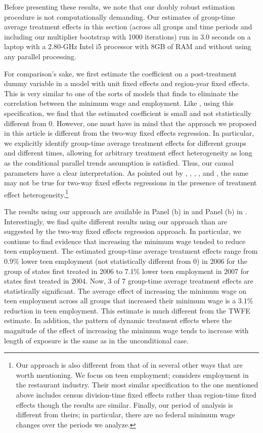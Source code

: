 \documentclass[11pt]{article}%
\theoremstyle{plain}
\numberwithin{sassumption}{section}
\numberwithin{equation}{section}
\begin{document}
Before presenting these results, we note that our doubly robust estimation
procedure is not computationally demanding. Our estimates of group-time
average treatment effects in this section (across all groups and time periods
and including our multiplier bootstrap with 1000 iterations) run in 3.0 
seconds on a laptop with a 2.80-GHz Intel i5 processor with 8GB of RAM and
without using any parallel processing.

For comparison's sake, we first estimate the coefficient on a post-treatment
dummy variable in a model with unit fixed effects and region-year fixed
effects. This is very similar to one of the sorts of models that
\cite{Dube2010} finds to eliminate the correlation between the minimum wage
and employment. Like \cite{Dube2010}, using this specification, we find that
the estimated coefficient is small and not statistically different from 0.
However, one must have in mind that the approach we proposed in this article
is different from the two-way fixed effects regression. In particular, we
explicitly identify group-time average treatment effects for different groups
and different times, allowing for arbitrary treatment effect heterogeneity as
long as the conditional parallel trends assumption is satisfied. Thus, our
causal parameters have a clear interpretation. As pointed out by
\cite{Wooldridge2005}, \cite{Chernozhukov2013}, \cite{DeChaisemartin2016},
\cite{Borusyak2017}, \cite{Goodman-bacon2017} and \cite{sloczynski-2018}, the
same may not be true for two-way fixed effects regressions in the presence of
treatment effect heterogeneity.\footnote{Our approach is also different from
that of \cite{Dube2010} in several other ways that are worth mentioning. We
focus on teen employment; \cite{Dube2010} considers employment in the
restaurant industry. Their most similar specification to the one mentioned
above includes census division-time fixed effects rather than region-time
fixed effects though the results are similar. Finally, our period of analysis
is different from theirs; in particular, there are no federal minimum wage
changes over the periods we analyze.}

The results using our approach are available in Panel (b) in 
and Panel (b) in . Interestingly, we find quite different
results using our approach than are suggested by the two-way fixed effects
regression approach. In particular, we continue to find evidence that
increasing the minimum wage tended to reduce teen employment. The estimated
group-time average treatment effects range from 0.9\% lower teen employment
(not statistically different from 0) in 2006 for the group of states first
treated in 2006 to 7.1\% lower teen employment in 2007 for states first
treated in 2004. Now, 3 of 7 group-time average treatment effects are
statistically significant. The average effect of increasing the minimum wage
on teen employment across all groups that increased their minimum wage is a
3.1\% reduction in teen employment. This estimate is much different from the
TWFE estimate. In addition, the pattern of dynamic treatment effects where the
magnitude of the effect of increasing the minimum wage tends to increase with
length of exposure is the same as in the unconditional case.
\end{document}
